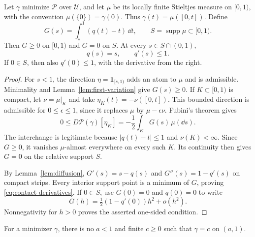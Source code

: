 \begin{lemma}
\label{lem:contact}
Let $\gamma$ minimize $\mathcal P$ over $\mathcal U$, and let
$\mu$ be its locally finite Stieltjes measure on $[0,1)$, with the
convention $\mu(\{0\})=\gamma(0)$.  Thus
$\gamma(t)=\mu([0,t])$.  Define
\begin{equation}
 G(s)=\int_s^1(q(t)-t)\,\dd t,
 \qquad S=\operatorname{supp}\mu\subset[0,1).
 \label{eq:contact-potential}
\end{equation}
Then $G\geq0$ on $[0,1)$ and $G=0$ on $S$.  At every
$s\in S\cap(0,1)$,
\begin{equation}
 q(s)=s,\qquad q'(s)\leq1.
 \label{eq:contact-derivatives}
\end{equation}
If $0\in S$, then also $q'(0)\leq1$, with the derivative from
the right.
\end{lemma}

\begin{proof}
For $s<1$, the direction $\eta=\mathbf1_{[s,1)}$ adds an atom
to $\mu$ and is admissible.  Minimality and
Lemma~\ref{lem:first-variation} give $G(s)\geq0$.
If $K\subset[0,1)$ is compact, let $\nu=\mu|_K$ and take
$\eta_K(t)=-\nu([0,t])$.  This bounded direction is admissible
for $0\leq\epsilon\leq1$, since it replaces $\mu$ by
$\mu-\epsilon\nu$.  Fubini's theorem gives
\[
 0\leq D\mathcal P(\gamma)[\eta_K]
      =-\frac12\int_K G(s)\,\mu(\dd s).
\]
The interchange is legitimate because $|q(t)-t|\leq1$ and
$\nu(K)<\infty$.  Since $G\geq0$, it vanishes
$\mu$-almost everywhere on every such $K$.  Its continuity
then gives $G=0$ on the relative support $S$.

By Lemma~\ref{lem:diffusion},
$G'(s)=s-q(s)$ and $G''(s)=1-q'(s)$ on compact strips.
Every interior support point is a minimum of $G$, proving
\eqref{eq:contact-derivatives}.  If $0\in S$, use $G(0)=0$
and $q(0)=0$ to write
\[
 G(h)=\tfrac12(1-q'(0))h^2+o(h^2).
\]
Nonnegativity for $h>0$ proves the asserted one-sided condition.
\end{proof}

\begin{lemma}
\label{lem:no-terminal-plateau}
For a minimizer $\gamma$, there is no $a<1$ and finite $c\geq0$
such that $\gamma=c$ on $(a,1)$.
\end{lemma}


